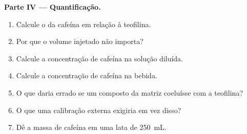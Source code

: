 \begin{problem}
\medskip
\noindent\textbf{Parte IV --- Quantificação.}
\begin{enumerate}[resume]
  \item Calcule o  da cafeína em relação à teofilina.
  \item Por que o volume injetado não importa?
  \item Calcule a concentração de cafeína na solução diluída.
  \item Calcule a concentração de cafeína na bebida.
  \item O que daria errado se um composto da matriz coeluísse com a teofilina?
  \item O que uma calibração externa exigiria em vez disso?
  \item Dê a massa de cafeína em uma lata de \qty{250}{mL}.
\end{enumerate}
\end{problem}
